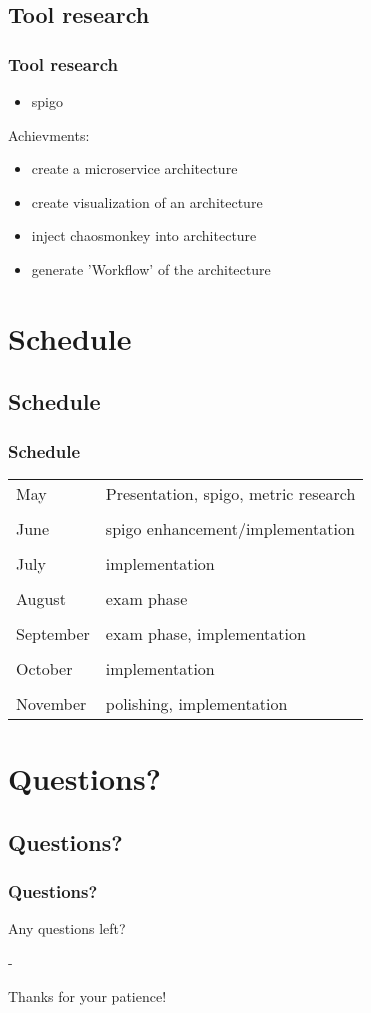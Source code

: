 \documentclass[xcolor=dvipsnames]{beamer}
\begin{document}
\subsection{Tool research}
\begin{frame}
	\frametitle{Tool research}
	
	\begin{itemize}
		\item spigo\newline
	\end{itemize}
	
	Achievments:
	\begin{itemize}
		\item create a microservice architecture
		\item create visualization of an architecture
		\item inject chaosmonkey into architecture
		\item generate 'Workflow' of the architecture
	\end{itemize}
	
\end{frame}


\section{Schedule}
\subsection{Schedule}
\begin{frame}
	\frametitle{Schedule}
	
	\begin{tabular}{l|l} 
		May & Presentation, spigo, metric research \\
		& \\
		June & spigo enhancement/implementation \\
		& \\
		July & implementation \\
		& \\
		August & exam phase \\
		& \\
		September & exam phase, implementation \\
		& \\
		October & implementation \\
		& \\
		November & polishing, implementation \\
	\end{tabular}
\end{frame}

\section{Questions?}
\subsection{Questions?}
\begin{frame}
	\frametitle{Questions?}
	
	\begin{LARGE}
		\begin{center}
			Any questions left?
		
			-
		
			Thanks for your patience!
		\end{center}
	\end{LARGE}
	
\end{frame}
\end{document}
